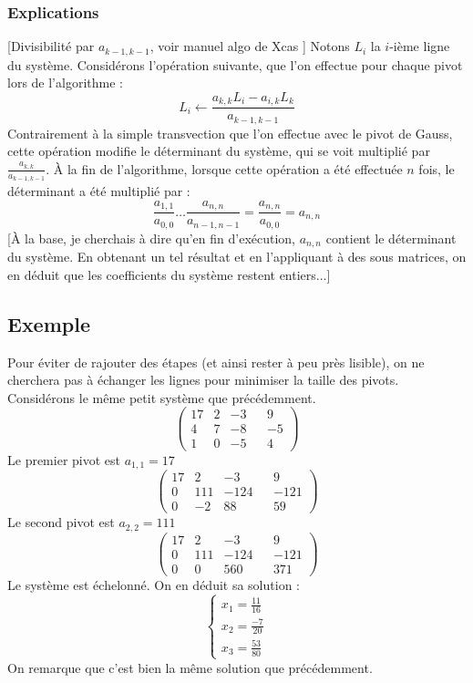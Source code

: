 \documentclass[french]{article}
\begin{document}
\subsubsection{Explications}
[Divisibilité par $a_{k-1,k-1}$, voir manuel algo de Xcas ]
\newline
Notons $L_i$ la $i$-ième ligne du système. Considérons l'opération suivante, que l'on effectue pour chaque pivot lors de l'algorithme :
$$L_i \gets \frac{a_{k,k} L_i - a_{i,k} L_k}{a_{k-1,k-1}}$$
Contrairement à la simple transvection que l'on effectue avec le pivot de Gauss, cette opération modifie le déterminant du système, qui se voit multiplié par $\frac{a_{k,k}}{a_{k-1,k-1}}$. À la fin de l'algorithme, lorsque cette opération a été effectuée $n$ fois, le déterminant a été multiplié par :
$$\frac{a_{1,1}}{a_{0,0}} \hdots \frac{a_{n,n}}{a_{n-1,n-1}} = \frac{a_{n,n}}{a_{0,0}} = a_{n,n}$$
[À la base, je cherchais à dire qu'en fin d'exécution, $a_{n,n}$ contient le déterminant du système. En obtenant un tel résultat et en l'appliquant à des sous matrices, on en déduit que les coefficients du système restent entiers...]
\subsection{Exemple}
Pour éviter de rajouter des étapes (et ainsi rester à peu près lisible), on ne cherchera pas à échanger les lignes pour minimiser la taille des pivots. Considérons le même petit système que précédemment.
\begin{equation*}
	\begin{pmatrix}
		17 & 2 & -3 & & 9\\
		4 & 7 & -8 & & -5\\
		1 & 0 & -5 & & 4
	\end{pmatrix}
\end{equation*}
Le premier pivot est $a_{1,1} = 17$
\begin{equation*}
	\begin{pmatrix}
		17 & 2 & -3 & & 9\\
		0 & 111 & -124 & & -121\\
		0 & -2 & 88 & & 59
	\end{pmatrix}
\end{equation*}
Le second pivot est $a_{2,2} = 111$
\begin{equation*}
	\begin{pmatrix}
		17 & 2 & -3  & & 9\\
		0 & 111 & -124 & & -121\\
		0 & 0 & 560 & & 371
	\end{pmatrix}
\end{equation*}
Le système est échelonné. On en déduit sa solution :
\begin{equation*}
	\begin{cases}
		x_1 = \frac{11}{16}\\
		x_2 = \frac{-7}{20}\\
		x_3 = \frac{53}{80}
	\end{cases}
\end{equation*}
On remarque que c'est bien la même solution que précédemment.
\end{document}
